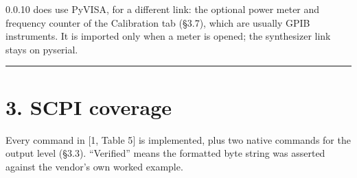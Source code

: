\documentclass[
\directlua{luaotfload.add_fallback("qsfallback", {"DejaVu Sans:mode=harf;", "DejaVu Sans Mono:mode=harf;", "DejaVu Math TeX Gyre:mode=harf;"})}
  10pt,
  letterpaper,
]{article}
\begin{document}
0.0.10 does use PyVISA, for a different link: the optional power meter
and frequency counter of the Calibration tab (§3.7), which are usually
GPIB instruments. It is imported only when a meter is opened; the
synthesizer link stays on pyserial.

\begin{center}\rule{0.5\linewidth}{0.5pt}\end{center}

\hypertarget{scpi-coverage}{%
\section{3. SCPI coverage}\label{scpi-coverage}}

Every command in {[}1, Table 5{]} is implemented, plus two native
commands for the output level (§3.3). ``Verified'' means the formatted
byte string was asserted against the vendor's own worked example.
\end{document}

